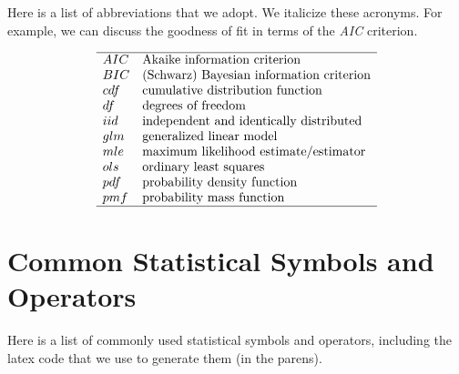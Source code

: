 \documentclass[
]{book}
\begin{document}
Here is a list of abbreviations that we adopt. We italicize these acronyms. For example, we can discuss the goodness of fit in terms of the \emph{AIC} criterion.

\[
\begin{array}{ll}
\hline
AIC & \text{Akaike information criterion} \\
BIC & \text{(Schwarz) Bayesian information criterion} \\
cdf & \text{cumulative distribution function} \\
df & \text{degrees of freedom} \\
iid & \text{independent and identically distributed} \\
glm & \text{generalized linear model} \\
mle & \text{maximum likelihood estimate/estimator}\\
ols & \text{ordinary least squares} \\
pdf & \text{probability density function} \\
pmf & \text{probability mass function} \\ \hline
\end{array}
\]

\hypertarget{S:StatSymbols}{%
\section{Common Statistical Symbols and Operators}\label{S:StatSymbols}}

Here is a list of commonly used statistical symbols and operators, including the latex code that we use to generate them (in the parens).
\end{document}
